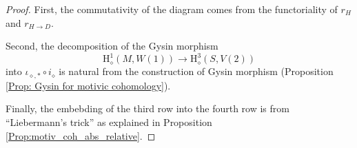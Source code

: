 \documentclass[11pt, a4paper]{amsart}
\theoremstyle{plain}
\theoremstyle{definition}
\numberwithin{equation}{section}
\begin{document}
\begin{proof}
    \par First, the commutativity of the diagram comes from the functoriality of $r_{H}$ and $r_{H \rightarrow D}$. 
    \par Second, the decomposition of the Gysin morphism 
    \begin{equation*}
        \mathrm{H}^{1}_{\mathrm{\diamond}}(M, W(1)) \rightarrow \mathrm{H}^{3}_{\mathrm{\diamond}}(S, V(2))
    \end{equation*}
    into $\iota_{\diamond, *} \circ i_{\diamond}$ is natural from the construction of Gysin morphism (Proposition \ref{Prop: Gysin for motivic cohomology}). 
    \par Finally, the embebding of the third row into the fourth row is from ``Liebermann’s trick'' as explained in Proposition \ref{Prop:motiv_coh_abs_relative}. 
\end{proof}
\end{document}
